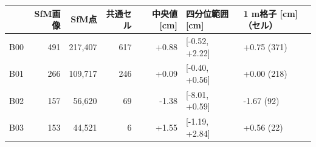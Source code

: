 \begin{tabular}{@{}lrrrrll@{}}\toprule
 & SfM画像 & SfM点 & 共通セル & 中央値 [cm] & 四分位範囲 [cm] & 1 m格子 [cm]（セル）\\\midrule
B00 & 491 & 217,407 & 617 & +0.88 & [-0.52, +2.22] & +0.75 (371)\\
B01 & 266 & 109,717 & 246 & +0.09 & [-0.40, +0.56] & +0.00 (218)\\
B02 & 157 & 56,620 & 69 & -1.38 & [-8.01, +0.59] & -1.67 (92)\\
B03 & 153 & 44,521 & 6 & +1.55 & [-1.19, +2.84] & +0.56 (22)\\
\bottomrule\end{tabular}
